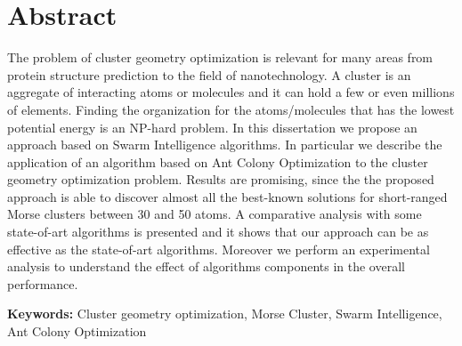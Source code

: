 \chapter*{Abstract}
\renewcommand{\headrulewidth}{0pt}
\vspace{1cm}
	The problem of cluster geometry optimization is relevant for many areas from protein structure prediction to the field of nanotechnology. A cluster is an aggregate of interacting atoms or molecules and it can hold a few or even millions of elements. Finding the organization for the \mbox{atoms/molecules} that has the lowest potential energy is an NP-hard problem. In this dissertation we propose an approach based on Swarm Intelligence algorithms. In particular we describe the application of an algorithm based on Ant Colony Optimization to the cluster geometry optimization problem.
	Results are promising, since the the proposed approach is able to discover almost all the best-known solutions for short-ranged Morse clusters between 30 and 50 atoms. A comparative analysis with some state-of-art algorithms is presented and it shows that our approach can be as effective as the state-of-art algorithms. Moreover we perform an experimental analysis to understand the effect of algorithms components in the overall performance.
	
\vspace{0.5cm}
\textbf{Keywords:} Cluster geometry optimization, Morse Cluster, Swarm Intelligence, Ant Colony Optimization
